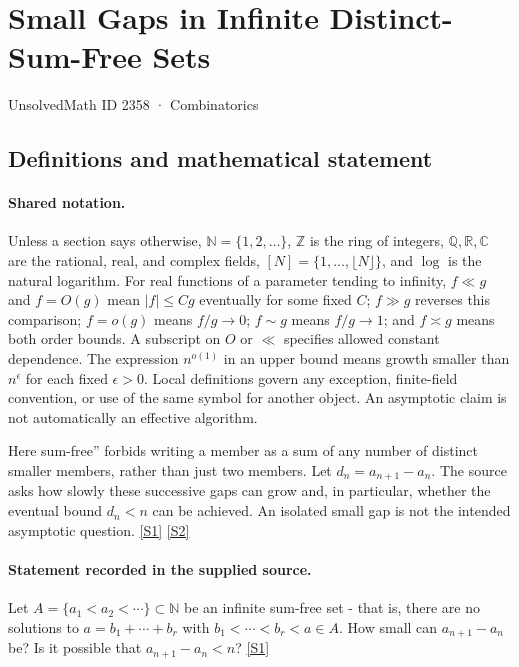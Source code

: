 \documentclass[11pt,a4paper]{article}
\newcommand{\N}{\mathbb{N}}
\newcommand{\Z}{\mathbb{Z}}
\newcommand{\Q}{\mathbb{Q}}
\newcommand{\R}{\mathbb{R}}
\newcommand{\C}{\mathbb{C}}
\newcommand{\sref}[2]{\hyperlink{source:#1:#2}{[S#2]}}
\begin{document}

\setcounter{section}{2357}

\section{Small Gaps in Infinite Distinct-Sum-Free Sets}\label{2358}

{\small\sffamily UnsolvedMath ID 2358 · Combinatorics}

\subsection{Definitions and mathematical statement}

\paragraph{Shared notation.}Unless a section says otherwise, $\N=\{1,2,\ldots\}$,
$\Z$ is the ring of integers, $\Q,\R,\C$ are the rational, real, and complex
fields, $[N]=\{1,\ldots,\lfloor N\rfloor\}$, and $\log$ is the natural
logarithm. For real functions of a parameter tending to infinity,
$f\ll g$ and $f=O(g)$ mean $|f|\leq Cg$ eventually for some fixed $C$;
$f\gg g$ reverses this comparison; $f=o(g)$ means $f/g\to0$;
$f\sim g$ means $f/g\to1$; and $f\asymp g$ means both order bounds.
A subscript on $O$ or $\ll$ specifies allowed constant dependence.
The expression $n^{o(1)}$ in an upper bound means growth smaller than
$n^\epsilon$ for each fixed $\epsilon>0$. Local definitions govern any
exception, finite-field convention, or use of the same symbol for another
object. An asymptotic claim is not automatically an effective algorithm.



Here sum-free'' forbids writing a member as a sum of any number of distinct smaller members, rather than just two members. Let $d_n=a_{n+1}-a_n$. The source asks how slowly these successive gaps can grow and, in particular, whether the eventual bound $d_n<n$ can be achieved. An isolated small gap is not the intended asymptotic question. \sref{2358}{1} \sref{2358}{2}

\paragraph{Statement recorded in the supplied source.}
Let $A=\{a_1<a_2<\cdots\}\subset \mathbb{N}$ be an infinite sum-free set - that is, there are no solutions to $ a=b_1+\cdots+b_r $ with $b_1<\cdots<b_r<a\in A$. How small can $a_{n+1}-a_n$ be? Is it possible that $a_{n+1}-a_n<n$? \sref{2358}{1}
\end{document}
